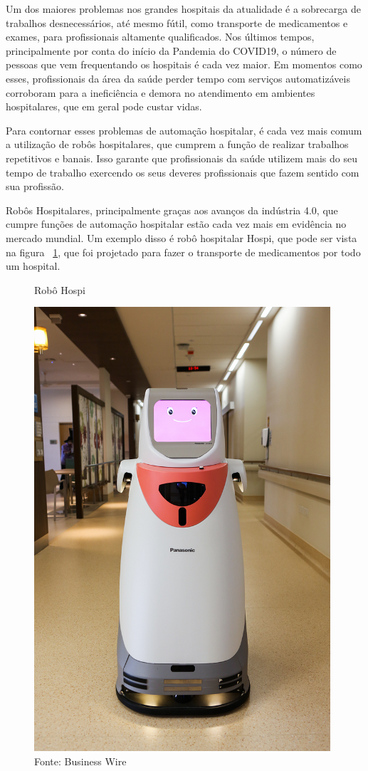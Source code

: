 \documentclass[../delivery_hospital_report.tex]{subfiles}
\begin{document}
Um dos maiores problemas nos grandes hospitais da atualidade é a sobrecarga de trabalhos desnecessários, até mesmo fútil, como transporte de medicamentos e exames, para profissionais altamente qualificados. Nos últimos tempos, principalmente por conta do início da Pandemia do COVID19, o número de pessoas que vem frequentando os hospitais é cada vez maior. Em momentos como esses, profissionais da área da saúde perder tempo com serviços automatizáveis corroboram para a ineficiência e demora no atendimento em ambientes hospitalares, que em geral pode custar vidas.

Para contornar esses problemas de automação hospitalar, é cada vez mais comum a utilização de robôs hospitalares, que cumprem a função de realizar trabalhos repetitivos e banais. Isso garante que profissionais da saúde utilizem mais do seu tempo de trabalho exercendo os seus deveres profissionais que fazem sentido com sua profissão. 

Robôs Hospitalares, principalmente graças aos avanços da indústria 4.0, que cumpre funções de automação hospitalar estão cada vez mais em evidência no mercado mundial. Um exemplo disso é robô hospitalar Hospi, que pode ser vista na figura ~\ref{fig: Robô Hospi}, que foi projetado para fazer o transporte de medicamentos por todo um hospital. 


\begin{figure}[h]
\centering
    \caption{Robô Hospi}
    \centering %
    \includegraphics[width=11cm]{hospi.jpg}
    \caption*{Fonte: Business Wire}
    \label{fig: Robô Hospi}
\end{figure}
\end{document}
